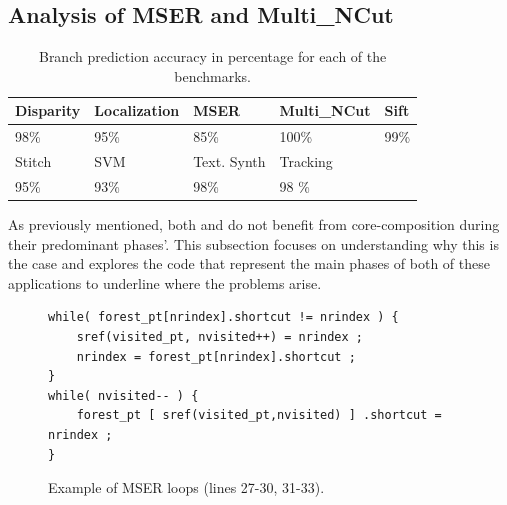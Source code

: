 \subsection{Analysis of MSER and Multi\_NCut}

\begin{table}[t]
  \small
  \centering
 \begin{tabular} { | l | l | l | l | l | }
 \hline
   \cellcolor[gray]{0.7}Disparity & \cellcolor[gray]{0.7} Localization& \cellcolor[gray]{0.7} MSER& \cellcolor[gray]{0.7} Multi\_NCut& \cellcolor[gray]{0.7} Sift\\ \hline
	98\%  & 95\% & 85\%  & 100\%& 99\%\\ \hline
	 \cellcolor[gray]{0.7} Stitch & \cellcolor[gray]{0.7} SVM & \cellcolor[gray]{0.7} Text. Synth & \cellcolor[gray]{0.7} Tracking&\\ \hline
	  95\%& 93\%& 98\%& 98 \%&\\ \hline
	\end{tabular}
  \caption{Branch prediction accuracy in percentage for each of the benchmarks.}\label{tab:sd-vbsbpred}
  \vspace{1em}
\end{table}

As previously mentioned, both  and  do not benefit from core-composition during their predominant phases'.
This subsection focuses on understanding why this is the case and explores the code that represent the main phases of both of these applications to underline where the problems arise.

\begin{figure}[t]
\lstset{language=C,numbersep=4pt}
\begin{center}
\begin{lstlisting}[firstnumber=27]
while( forest_pt[nrindex].shortcut != nrindex ) {          
	sref(visited_pt, nvisited++) = nrindex ;
	nrindex = forest_pt[nrindex].shortcut ;
}      
while( nvisited-- ) {
	forest_pt [ sref(visited_pt,nvisited) ] .shortcut = nrindex ;
}
\end{lstlisting}
\end{center}
\vspace{-1em}
\caption{Example of MSER loops (lines 27-30, 31-33).}
\label{lst:mser-ex}
\end{figure}


